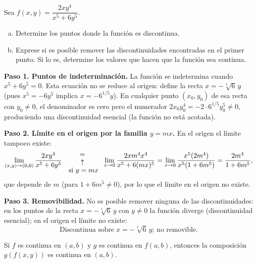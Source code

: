 \begin{prob}
Sea $f(x,y)=\dfrac{2xy^4}{x^5+6y^5}.$
\begin{enumerate}[(a)]
    \item Determine los puntos donde la función es discontinua.
    \item Exprese si es posible remover las discontinuidades encontradas en el primer punto. Si lo es, determine los valores que hacen que la función sea continua. 
\end{enumerate}
\begin{myproof}
\textbf{Paso 1. Puntos de indeterminación.} La función se indetermina cuando $x^5+6y^5=0.$ Esta ecuación no se reduce al origen: define la recta $x=-\sqrt[5]{6}\,y$ (pues $x^5=-6y^5$ implica $x=-6^{1/5}y$). En cualquier punto $(x_0,y_0)$ de esa recta con $y_0\neq 0$, el denominador es cero pero el numerador $2x_0y_0^4=-2\cdot 6^{1/5}y_0^5\neq 0$, produciendo una discontinuidad esencial (la función no está acotada).

\textbf{Paso 2. Límite en el origen por la familia $y=mx$.} En el origen el límite tampoco existe:
 \begin{align*}
\displaystyle\lim_{(x,y)\to (0,0)} \dfrac{2xy^4}{x^5+6y^5} {{=}\atop {\begin{array}{c}
\uparrow\\ \text{ si $y=mx$}\end{array}} } \displaystyle\lim_{x\to 0}\dfrac{2xm^4x^4}{x^5+6(mx)^5}=\displaystyle\lim_{x\to 0}\dfrac{x^5(2m^4)}{x^5(1+6m^5)}=\displaystyle\dfrac{2m^4}{1+6m^5},
\end{align*}
que depende de $m$ (para $1+6m^5\neq 0$), por lo que el límite en el origen no existe.

\textbf{Paso 3. Removibilidad.} No es posible remover ninguna de las discontinuidades: en los puntos de la recta $x=-\sqrt[5]{6}\,y$ con $y\neq 0$ la función diverge (discontinuidad esencial); en el origen el límite no existe:
\[
\boxed{\text{Discontinua sobre } x=-\sqrt[5]{6}\,y;\ \text{no removible.}}
\]
\end{myproof}
\end{prob}

\begin{theorem}
Si $f$ es continua en $(a,b)$ y $g$ es continua en $f(a,b)$, entonces
la composición $g(f(x,y))$ es continua en $(a,b)$.
\end{theorem}

